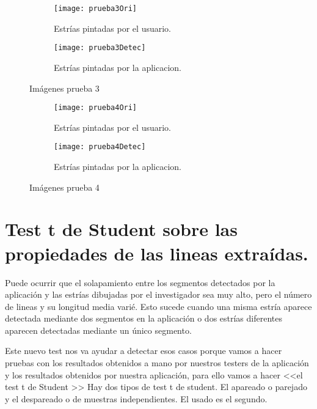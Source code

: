 \begin{figure}
	\begin{subfigure}[c]{.5\linewidth}
	\centering\large \texttt{[image: prueba3Ori]}
	\caption{Estrías pintadas por el usuario.}\label{fig:orip3}
	\end{subfigure}%
	\begin{subfigure}[c]{.5\linewidth}
	\centering\large \texttt{[image: prueba3Detec]}
	\caption{Estrías pintadas por la aplicacion.}\label{fig:calcp3}
	\end{subfigure}%
	\caption{Imágenes prueba 3}
	\label{fig:p3}

\end{figure}



\begin{figure}
	\begin{subfigure}[c]{.5\linewidth}
	\centering\large \texttt{[image: prueba4Ori]}
	\caption{Estrías pintadas por el usuario.}\label{fig:orip4} 
	\end{subfigure}%
	\begin{subfigure}[c]{.5\linewidth}
	\centering\large \texttt{[image: prueba4Detec]}
	\caption{Estrías pintadas por la aplicacion.}\label{fig:calcp4}
	\end{subfigure}%
	\caption{Imágenes prueba 4}
	\label{fig:p4}

\end{figure}

\section{Test t de Student sobre las propiedades de las lineas extraídas.}

Puede ocurrir que el solapamiento entre los segmentos detectados por la aplicación y las estrías dibujadas por el investigador sea muy alto, pero el número de lineas y su longitud media varié. Esto sucede cuando una misma estría aparece detectada mediante dos segmentos en la aplicación o dos estrías diferentes aparecen detectadas mediante un único segmento.

Este nuevo test nos va ayudar a detectar esos casos porque vamos a hacer pruebas con los resultados obtenidos a mano por nuestros testers de la aplicación y los resultados obtenidos por nuestra aplicación, para ello vamos a hacer <<el test t de Student \cite{wiki:testStude}>>
Hay dos tipos de test t de student. El apareado o parejado y el despareado o de muestras independientes. El usado es el segundo.

